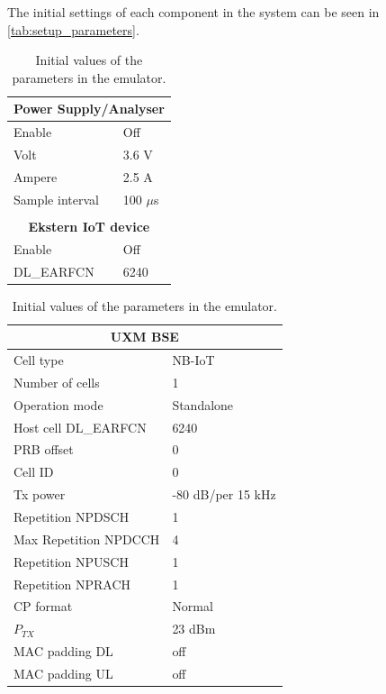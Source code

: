 The initial settings of each component in the system can be seen in \autoref{tab:setup_parameters}.

\begin{table}[H]
\captionsetup{belowskip=0em}
\noindent
\centering
\begin{minipage}[t]{0.48\textwidth}
\begin{tabular}{|p{4cm}|p{2cm}|}
\hline
\multicolumn{2}{|c|}{\textbf{Power Supply/Analyser}}                         \\ \hline
Enable             & Off            \\ \hline
Volt               & 3.6 V          \\ \hline
Ampere             & 2.5 A          \\ \hline
Sample interval	   & 100 $\mu$s		\\ \hline
\multicolumn{2}{c}{}\\ \hline
\multicolumn{2}{|c|}{\textbf{Ekstern IoT device}}                            \\ \hline
Enable             & Off            \\ \hline
DL\_EARFCN         & 6240           \\ \hline
\end{tabular}
\end{minipage}%
\hfill
\begin{minipage}[t]{0.48\textwidth}
\begin{tabular}{|p{4cm}|p{2cm}|} \hline
\multicolumn{2}{|c|}{\textbf{UXM \gls{BSE}}} \\ \hline
Cell type			 & NB-IoT         \\ \hline
Number of cells		 & 1              \\ \hline
Operation mode		 & Standalone     \\ \hline
Host cell DL\_EARFCN & 6240           \\ \hline
PRB offset			 & 0	          \\ \hline
Cell ID				 & 0              \\ \hline
Tx power			 & -80 dB/per 15 kHz \\ \hline
Repetition NPDSCH	 & 1	          \\ \hline
Max Repetition NPDCCH & 4	          \\ \hline
Repetition NPUSCH	 & 1	          \\ \hline
Repetition NPRACH	 & 1	          \\ \hline
CP format			 & Normal         \\ \hline
$P_{TX}$				 & 23 dBm         \\ \hline
MAC padding DL		 & off       	  \\ \hline
MAC padding UL		 & off       	  \\ \hline
\end{tabular}
\end{minipage}
\caption{Initial values of the parameters in the emulator.}
\label{tab:setup_parameters}
\end{table}



